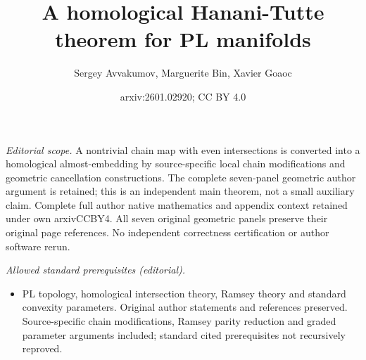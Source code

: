 \documentclass[11pt]{article}
\title{A homological Hanani-Tutte theorem for PL manifolds}
\author{Sergey Avvakumov, Marguerite Bin, Xavier Goaoc}
\date{arxiv:2601.02920; CC BY 4.0}
\begin{document}
\maketitle
\noindent\textit{Editorial scope.} A nontrivial chain map with even intersections is converted into a homological almost-embedding by source-specific local chain modifications and geometric cancellation constructions. The complete seven-panel geometric author argument is retained; this is an independent main theorem, not a small auxiliary claim. Complete full author native mathematics and appendix context retained under own arxivCCBY4. All seven original geometric panels preserve their original page references. No independent correctness certification or author software rerun.\par\medskip
\noindent\textit{Allowed standard prerequisites (editorial).}\begin{itemize}
\item PL topology, homological intersection theory, Ramsey theory and standard convexity parameters. Original author statements and references preserved. Source-specific chain modifications, Ramsey parity reduction and graded parameter arguments included; standard cited prerequisites not recursively reproved.
\end{itemize}\medskip
\end{document}
